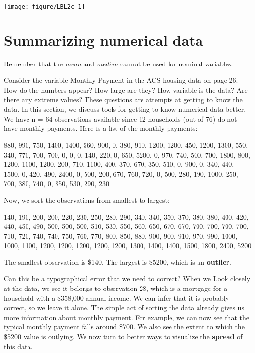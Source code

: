 \documentclass[11pt, chapterprefix=true]{scrbook}\usepackage[]{graphicx}\usepackage[]{color}
\begin{document}
{\centering \texttt{[image: figure/LBL2c-1]} 

}




\section{Summarizing numerical data}

Remember that the	\textit{mean} and \textit{median} cannot be used for nominal variables.

Consider the variable Monthly Payment in the ACS housing data on page 26.  How do the numbers appear?  How large are they? How variable is the data?  Are there any extreme values? These questions are attempts at getting to know the data.  In this section, we discuss tools for getting to know numerical data better.  We have n = 64 observations available since 12 households (out of 76) do not have monthly payments.  Here is a list of the monthly payments:

{\small{
880, 990, 750, 1400, 1400, 560, 900, 0, 380, 910, 1200, 1200, 450, 1200, 1300, 550, 340, 770, 700, 700, 0, 0, 0, 140, 220, 0, 650, 5200, 0, 970, 740, 500, 700, 1800, 800, 1200, 1000, 1200, 200, 710, 1100, 400, 370, 670, 350, 510, 0, 900, 0, 340, 440, 1500, 0, 420, 490, 2400, 0, 500, 200, 670, 760, 720, 0, 500, 280, 190, 1000, 250, 700, 380, 740, 0, 850, 530, 290, 230
}}

Now, we sort the observations from smallest to largest:

{\small{
140, 190, 200, 200, 220, 230, 250, 280, 290, 340, 340, 350, 370, 380, 380, 400, 420, 440, 450, 490, 500, 500, 500, 510, 530, 550, 560, 650, 670, 670, 700, 700, 700, 700, 710, 720, 740, 740, 750, 760, 770, 800, 850, 880, 900, 900, 910, 970, 990, 1000, 1000, 1100, 1200, 1200, 1200, 1200, 1200, 1300, 1400, 1400, 1500, 1800, 2400, 5200
}}

The smallest observation is \$140.  The largest is \$5200, which is an \textbf{outlier}.


Can this be a typographical error that we need to correct?  When we Look closely at the data, we see it belongs to observation 28, which is a mortgage for a household with a \$358,000 annual income.  We can infer that it is probably correct, so we leave it alone. The simple act of sorting the data already gives us more information about monthly payment.  For example, we can now see that the typical monthly payment falls around \$700.  We also see the extent to which the \$5200 value is outlying. We now turn to better ways to visualize the \textbf{spread} of this data.
\end{document}
